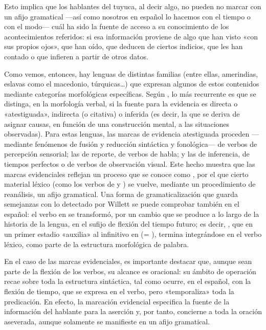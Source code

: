 Esto implica que los hablantes del tuyuca, al decir algo, no pueden no marcar
con un afijo gramatical ---así como nosotros en español lo hacemos con el tiempo
o con el modo--- cuál ha sido la fuente de acceso a su conocimiento de los
acontecimientos referidos: si esa información proviene de algo que han visto
«con sus propios ojos», que han oído, que deducen de ciertos indicios, que les
han contado o que infieren a partir de otros datos.

Como vemos, entonces, hay lenguas de distintas familias (entre ellas, amerindias,
eslavas como el macedonio, túrquicas\ldots) que expresan algunos de estos
contenidos mediante categorías morfológicas específicas. Según \textcite{willett1988}, lo más
recurrente es que se distinga, en la morfología verbal, si la fuente para la
evidencia es directa o «atestiguada», indirecta (o citativa) o inferida (es
decir, la que se deriva de asignar causas, en función de una construcción
mental, a las situaciones observadas). Para estas lenguas, las marcas de
evidencia atestiguada proceden ---mediante fenómenos de fusión y reducción
sintáctica y fonológica--- de verbos de percepción sensorial; las de reporte, de
verbos de habla; y las de inferencia, de tiempos perfectos o de verbos de
observación visual. Este hecho muestra que las marcas evidenciales reflejan un
proceso que se conoce como 
\parencite{company2016}, por el que cierto material léxico (como los verbos de
 y ) se vuelve, mediante un procedimiento de
reanálisis, un afijo gramatical. Una forma de gramaticalización que guarda
semejanzas con lo detectado por Willett se puede comprobar también en el
español: el verbo  en  se transformó, por un cambio que se produce a lo largo de la
historia de la lengua, en el sufijo de flexión del tiempo futuro; es decir,
, que en un primer estadio «auxilia» al infinitivo en  (= ), termina integrándose en el verbo léxico, como parte de
la estructura morfológica de palabra.

En el caso de las marcas evidenciales, es importante destacar que, aunque sean
parte de la flexión de los verbos, su alcance es oracional: su ámbito de
operación recae sobre toda la estructura sintáctica, tal como ocurre, en el
español, con la flexión de tiempo, que se expresa en el verbo, pero «temporaliza»
toda la predicación. En efecto, la marcación evidencial especifica la fuente de
la información del hablante para la aserción y, por tanto, concierne a toda la
oración aseverada, aunque solamente se manifieste en un afijo gramatical.

